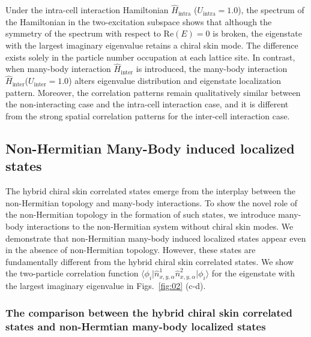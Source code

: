 \documentclass[longbibliography, aps, prx, amsmath, amssymb, amsfonts, twocolumn,superscriptaddress, footinbib]{revtex4-1}
\begin{document}
   Under the intra-cell interaction Hamiltonian $\hat{H}_{\text{intra}}$ ($U_{\text{intra}}=1.0$), the spectrum of the Hamiltonian in the two-excitation subspace shows that although the symmetry of the spectrum with respect to $\mathrm{Re}(E)=0$ is broken, the eigenstate with the largest imaginary eigenvalue retains a chiral skin mode. 
	The difference exists solely in the particle number occupation at each lattice site. In contrast, when many-body interaction $\hat{H}_{\text{inter}}$ is introduced, the many-body interaction $\hat{H}_{\text{inter}}$($U_{\text{inter}}=1.0$) alters eigenvalue distribution and eigenstate localization pattern. Moreover,
    the correlation patterns remain qualitatively similar between the non-interacting case and the intra-cell interaction case, and it is different from the strong spatial correlation patterns for the inter-cell interaction case. 
    

	\subsection{Non-Hermitian Many-Body induced localized states\label{sec:NHMBL}}

	The hybrid chiral skin correlated states emerge from the interplay between the non-Hermitian topology and many-body interactions. To show the novel role of the non-Hermitian topology in the formation of such states, we introduce many-body interactions to the non-Hermitian system without chiral skin modes.
	We demonstrate that non-Hermitian many-body induced localized states appear even in the absence of non-Hermitian topology. However, these states are fundamentally different from the hybrid chiral skin correlated states.
    We show the two-particle correlation function $\langle \phi_i \vert \hat{n}^1_{x,y,\alpha} \hat{n}^2_{x,y,\alpha} \vert \phi_i \rangle$ for the eigenstate with the largest imaginary eigenvalue in Figs.~\ref{fig:02} (c-d).

	\subsubsection{The comparison between the hybrid chiral skin correlated states and non-Hermtian many-body localized states~\label{sec:appendixE_comp}}
    
\end{document}
